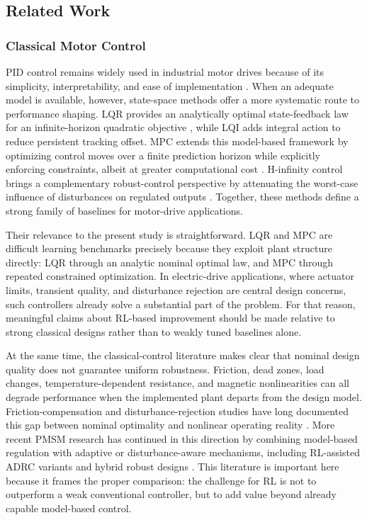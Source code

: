 \documentclass[conference]{IEEEtran}
\begin{document}
\subsection{Related Work}
\subsubsection{Classical Motor Control}
PID control remains widely used in industrial motor drives because of its simplicity, interpretability, and ease of implementation \cite{astrom1995}. When an adequate model is available, however, state-space methods offer a more systematic route to performance shaping. LQR provides an analytically optimal state-feedback law for an infinite-horizon quadratic objective \cite{kalman1960,anderson1971}, while LQI adds integral action to reduce persistent tracking offset. MPC extends this model-based framework by optimizing control moves over a finite prediction horizon while explicitly enforcing constraints, albeit at greater computational cost \cite{mayne2000}. H-infinity control brings a complementary robust-control perspective by attenuating the worst-case influence of disturbances on regulated outputs \cite{doyle1989,zhou1996}. Together, these methods define a strong family of baselines for motor-drive applications.

Their relevance to the present study is straightforward. LQR and MPC are difficult learning benchmarks precisely because they exploit plant structure directly: LQR through an analytic nominal optimal law, and MPC through repeated constrained optimization. In electric-drive applications, where actuator limits, transient quality, and disturbance rejection are central design concerns, such controllers already solve a substantial part of the problem. For that reason, meaningful claims about RL-based improvement should be made relative to strong classical designs rather than to weakly tuned baselines alone.

At the same time, the classical-control literature makes clear that nominal design quality does not guarantee uniform robustness. Friction, dead zones, load changes, temperature-dependent resistance, and magnetic nonlinearities can all degrade performance when the implemented plant departs from the design model. Friction-compensation and disturbance-rejection studies have long documented this gap between nominal optimality and nonlinear operating reality \cite{armstrong1994}. More recent PMSM research has continued in this direction by combining model-based regulation with adaptive or disturbance-aware mechanisms, including RL-assisted ADRC variants and hybrid robust designs \cite{wang2023tec,wang2023tpe}. This literature is important here because it frames the proper comparison: the challenge for RL is not to outperform a weak conventional controller, but to add value beyond already capable model-based control.
\end{document}
